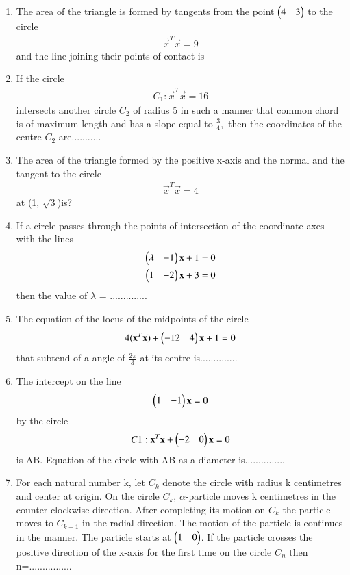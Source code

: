 \begin{enumerate}[label=\arabic*.,ref=\thesubsection.\theenumi]
\item The area of the triangle is formed by tangents from the point $\begin{pmatrix}4 & 3\end{pmatrix}$ to the circle 
\begin{align}
\vec{x}^T\vec{x} = 9
\end{align} 
and the line joining their points of contact is

\item If the circle 
\begin{align}
C_1:\vec{x}^T\vec{x} = 16
\end{align} 
intersects another circle $C_2$ of radius 5 in such a manner that common chord is of maximum length and has a slope equal to $\frac{3}{4},$ then the coordinates of the centre $C_2$ are...........

\item The area of the triangle formed by the positive x-axis and the normal and the tangent to the circle 
\begin{align}
\vec{x}^T\vec{x} = 4
\end{align} 
at (1, $\sqrt{3}$)is?

\item If a circle passes through the points of intersection of the coordinate axes with the lines 
\begin{align}
\begin{pmatrix}\lambda & -1\end{pmatrix}\mathbf{x} + 1 = 0\\
\begin{pmatrix}1 & -2\end{pmatrix}\mathbf{x} + 3 = 0
\end{align} 
then the value of $\lambda$ = .............. 

\item The equation of the locus of the midpoints of the circle 
\begin{align}
4(\mathbf{x}^T\mathbf{x}) + \begin{pmatrix}-12 & 4\end{pmatrix}\mathbf{x} + 1 = 0
\end{align} 
that subtend of a angle of $\frac{2\pi}{3}$  at its centre is..............

\item The intercept on the line
\begin{align} 
\begin{pmatrix}1 & -1\end{pmatrix}\mathbf{x} = 0
\end{align}
by the circle
\begin{align}
C1:\mathbf{x}^T\mathbf{x} + \begin{pmatrix}-2 & 0\end{pmatrix}\mathbf{x}=0
\end{align} 
is AB. Equation of the circle with AB as a diameter is...............

\item For each natural number k, let $C_k$ denote the circle with radius k centimetres and center at origin. On the circle $C_k$, $\alpha$-particle moves k centimetres in the counter clockwise direction. After completing its motion on $C_k$ the particle moves to $C_{k+1}$ in the radial direction. The motion of the particle is continues in the manner. The particle starts at $\begin{pmatrix}1 & 0\end{pmatrix}$. If the particle crosses the positive direction of the x-axis for the first time on the circle $C_n$ then n=................


\end{enumerate}
